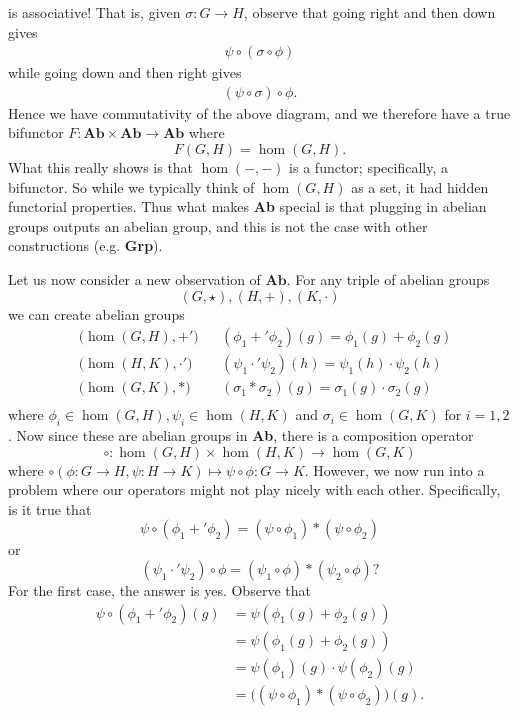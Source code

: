 is associative! That is, given $\sigma: G \to H$, observe that going right and then down 
gives
\begin{align*}
    \psi \circ (\sigma \circ \phi) 
\end{align*}
while going down and then right gives 
\begin{align*}
    (\psi \circ \sigma) \circ \phi.
\end{align*}
Hence we have commutativity of the above diagram, and we therefore have a 
true bifunctor $F: \textbf{Ab}\times\textbf{Ab} \to \textbf{Ab}$ where 
\[
    F(G,H) = \hom(G, H).
\]
\textcolor{NavyBlue}{What this really shows is that $\hom(-, -)$ is a functor; specifically, a bifunctor. 
So while we typically think of $\hom(G, H)$ as a set, it had hidden functorial properties. 
Thus what makes \textbf{Ab} special is that plugging in abelian groups outputs an 
abelian group, and this is not the case with other constructions (e.g. \textbf{Grp}).}

Let us now consider a new observation of $\textbf{Ab}$. For any triple of abelian groups
\[
    (G, \star), (H, +), (K, \cdot)
\]
we can create abelian groups 
\begin{align*}
    &\big(\hom(G, H), +'\big) &&(\phi_1 +' \phi_2)(g) = \phi_1(g) + \phi_2(g) \\
    &\big(\hom(H, K), \cdot'\big) &&(\psi_1 \cdot' \psi_2)(h) = \psi_1(h)\cdot \psi_2(h)  \\
    &\big(\hom(G, K), *\big) &&(\sigma_1 * \sigma_2)(g)= \sigma_1(g) \cdot \sigma_2(g) \\
\end{align*}
where $\phi_i \in \hom(G, H), \psi_i \in \hom(H, K)$ and $\sigma_i \in \hom(G, K)$ 
for $i = 1, 2$. Now since these are abelian groups in \textbf{Ab}, there is a composition operator 
\[
    \circ: \hom(G, H)\times \hom(H,K) \to \hom(G, K)
\]
where $\circ(\phi: G \to H, \psi: H \to K ) \mapsto \psi \circ \phi: G \to K$. 
However, we now run into a problem where our operators might not play nicely with each other. Specifically, is 
it true that 
\[
    \psi \circ (\phi_1 +' \phi_2) = (\psi \circ \phi_1) * (\psi \circ \phi_2)
\]
or 
\[
    (\psi_1 \cdot' \psi_2) \circ \phi = (\psi_1 \circ \phi) * (\psi_2 \circ \phi)?
\]
For the first case, the answer is yes. Observe that
\begin{align*}
    \psi \circ (\phi_1 +' \phi_2)(g) &= \psi(\phi_1(g) + \phi_2(g))\\
    &= \psi(\phi_1(g) + \phi_2(g))\\
    &= \psi(\phi_1)(g) \cdot \psi(\phi_2)(g)\\
    &= \big((\psi \circ \phi_1) * (\psi \circ \phi_2)\big)(g).
\end{align*}

